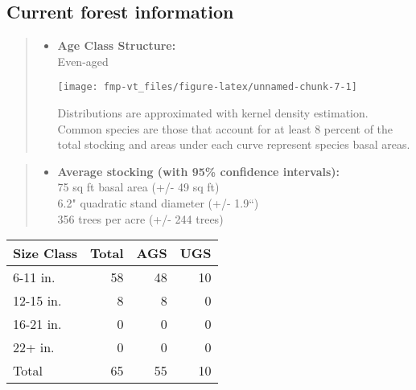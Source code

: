 \documentclass[]{tufte-handout}
\providecommand{\tightlist}{%
  \setlength{\itemsep}{0pt}\setlength{\parskip}{0pt}}
\begin{document}
\subsection{Current forest
information}\label{current-forest-information-1}

\begin{quote}
\begin{itemize}
\tightlist
\item
  \textbf{Age Class Structure:}\\
  \vspace{2pt} Even-aged\\

  \begin{marginfigure}
  \texttt{[image: fmp-vt\_files/figure-latex/unnamed-chunk-7-1]} \caption[Distributions are approximated with kernel density estimation]{Distributions are approximated with kernel density estimation. Common species are those that account for at least 8 percent of the total stocking and areas under each curve represent species basal areas.}\label{fig:unnamed-chunk-7}
  \end{marginfigure}
\end{itemize}
\end{quote}

\begin{quote}
\begin{itemize}
\tightlist
\item
  \textbf{Average stocking (with 95\% confidence intervals):}\\
  \vspace{2pt} 75 sq ft basal area (+/- 49 sq ft)\\
  6.2" quadratic stand diameter (+/- 1.9``)\\
  356 trees per acre (+/- 244 trees)\\
  \vspace{8pt}
\end{itemize}
\end{quote}

\begin{tabular}{lrrr}
\toprule
Size Class & Total & AGS & UGS\\
\midrule
6-11 in. & 58 & 48 & 10\\
12-15 in. & 8 & 8 & 0\\
16-21 in. & 0 & 0 & 0\\
22+ in. & 0 & 0 & 0\\
Total & 65 & 55 & 10\\
\bottomrule
\end{tabular}
\end{document}

